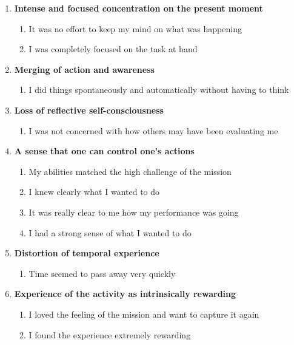\renewcommand{\labelenumiii}{\Roman{enumii}}
\begin{enumerate}
   \item \textbf{Intense and focused concentration on the present moment}
   \begin{enumerate}
     \item It was no effort to keep my mind on what was happening
     \item I was completely focused on the task at hand
   \end{enumerate}
   \item \textbf{Merging of action and awareness}
   \begin{enumerate}
     \item I did things spontaneously and automatically without having to think
   \end{enumerate}
   \item \textbf{Loss of reflective self-consciousness}
   \begin{enumerate}
     \item I was not concerned with how others may have been evaluating me
   \end{enumerate}
   \item \textbf{A sense that one can control one's actions}
   \begin{enumerate}
     \item My abilities matched the high challenge of the mission
     \item I knew clearly what I wanted to do
	 \item It was really clear to me how my performance was going
	 \item I had a strong sense of what I wanted to do
   \end{enumerate}
   \item \textbf{Distortion of temporal experience}
   \begin{enumerate}
     \item Time seemed to pass away very quickly
   \end{enumerate}
   \item \textbf{Experience of the activity as intrinsically rewarding}
   \begin{enumerate}
     \item I loved the feeling of the mission and want to capture it again
     \item I found the experience extremely rewarding
   \end{enumerate}
\end{enumerate}

